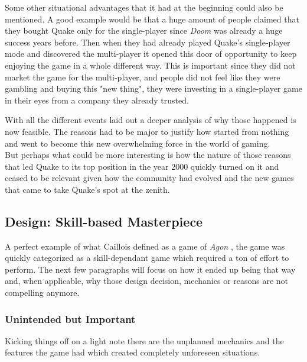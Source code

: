 {Some other situational advantages that it had at the beginning could also be mentioned. A good example would be that a huge amount of people claimed that they bought Quake only for the single-player since \textit{Doom} was already a huge success years before. Then when they had already played Quake's single-player mode and discovered the multi-player it opened this door of opportunity to keep enjoying the game in a whole different way. This is important since they did not market the game for the multi-player, and people did not feel like they were gambling and buying this "new thing", they were investing in a single-player game in their eyes from a company they already trusted.\\

}

With all the different events laid out a deeper analysis of why those happened is now feasible. The reasons had to be major to justify how started from nothing and went to become this new overwhelming force in the world of gaming.\\

But perhaps what could be more interesting is how the nature of those reasons that led Quake to its top position in the year 2000 quickly turned on it and ceased to be relevant given how the community had evolved and the new games that came to take Quake's spot at the zenith.\\

\subsection{Design: Skill-based Masterpiece}

A perfect example of what Caillois defined as a game of \textit{Agon} \citep{caillois1961man}, the game was quickly categorized as a skill-dependant game which required a ton of effort to perform. The next few paragraphs will focus on how it ended up being that way and, when applicable, why those design decision, mechanics or reasons are not compelling anymore.

\subsubsection{Unintended but Important}

Kicking things off on a light note there are the unplanned mechanics and the features the game had which created completely unforeseen situations.\\

